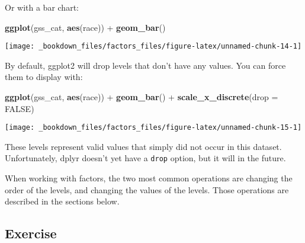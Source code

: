 \documentclass[]{book}
\newenvironment{Shaded}{\begin{snugshade}}{\end{snugshade}}
\newcommand{\KeywordTok}[1]{\textcolor[rgb]{0.13,0.29,0.53}{\textbf{{#1}}}}
\newcommand{\DataTypeTok}[1]{\textcolor[rgb]{0.13,0.29,0.53}{{#1}}}
\newcommand{\StringTok}[1]{\textcolor[rgb]{0.31,0.60,0.02}{{#1}}}
\newcommand{\CommentTok}[1]{\textcolor[rgb]{0.56,0.35,0.01}{\textit{{#1}}}}
\newcommand{\OtherTok}[1]{\textcolor[rgb]{0.56,0.35,0.01}{{#1}}}
\newcommand{\NormalTok}[1]{{#1}}
\begin{document}
\begin{Shaded}
\end{Shaded}

Or with a bar chart:

\begin{Shaded}
\begin{Highlighting}[]
\KeywordTok{ggplot}\NormalTok{(gss_cat, }\KeywordTok{aes}\NormalTok{(race)) +}
\StringTok{  }\KeywordTok{geom_bar}\NormalTok{()}
\end{Highlighting}
\end{Shaded}

\begin{center}\texttt{[image: \_bookdown\_files/factors\_files/figure-latex/unnamed-chunk-14-1]} \end{center}

By default, ggplot2 will drop levels that don't have any values. You can
force them to display with:

\begin{Shaded}
\begin{Highlighting}[]
\KeywordTok{ggplot}\NormalTok{(gss_cat, }\KeywordTok{aes}\NormalTok{(race)) +}
\StringTok{  }\KeywordTok{geom_bar}\NormalTok{() +}
\StringTok{  }\KeywordTok{scale_x_discrete}\NormalTok{(}\DataTypeTok{drop =} \OtherTok{FALSE}\NormalTok{)}
\end{Highlighting}
\end{Shaded}

\begin{center}\texttt{[image: \_bookdown\_files/factors\_files/figure-latex/unnamed-chunk-15-1]} \end{center}

These levels represent valid values that simply did not occur in this
dataset. Unfortunately, dplyr doesn't yet have a \texttt{drop} option,
but it will in the future.

When working with factors, the two most common operations are changing
the order of the levels, and changing the values of the levels. Those
operations are described in the sections below.

\subsection{Exercise}\label{exercise}
\end{document}

